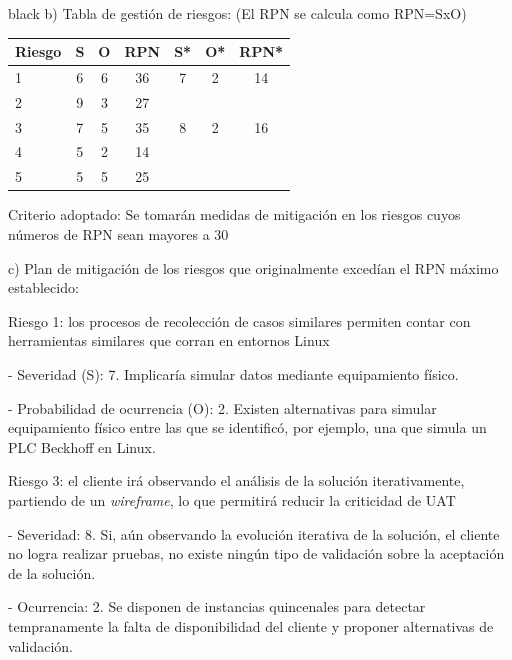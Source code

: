 \documentclass[11pt]{charter}
\begin{document}
\begin{consigna}{black}
b) Tabla de gestión de riesgos:      (El RPN se calcula como RPN=SxO)

\begin{table}[htpb]
\centering
\begin{tabularx}{\linewidth}{@{}|X|c|c|c|c|c|c|@{}}
\hline
\rowcolor[HTML]{C0C0C0} 
Riesgo & S & O & RPN & S* & O* & RPN* \\ \hline
\rowcolor[HTML]{D3D3D3} 
    1   &  6 &  6 & 36    &  7  &  2  & 14     \\ \hline
    2  &  9 &  3 &   27  &    &    &      \\ \hline
\rowcolor[HTML]{D3D3D3} 
    3  &  7 &  5 &   35  &  8  &  2  & 16     \\ \hline
    4  &  5 &  2 &   14  &    &    &      \\ \hline
    5  &  5 &  5 &   25  &    &    &      \\ \hline
\end{tabularx}%
\end{table}

Criterio adoptado: 
Se tomarán medidas de mitigación en los riesgos cuyos números de RPN sean mayores a 30

c) Plan de mitigación de los riesgos que originalmente excedían el RPN máximo establecido:
 
Riesgo 1: los procesos de recolección de casos similares permiten contar con herramientas similares que corran en entornos Linux  

  - Severidad (S): 7. Implicaría simular datos mediante equipamiento físico.
  
  - Probabilidad de ocurrencia (O): 2. Existen alternativas para simular equipamiento físico entre las que se identificó, por ejemplo, una que simula un PLC Beckhoff en Linux.

Riesgo 3: el cliente irá observando el análisis de la solución iterativamente, partiendo de un \textit{wireframe}, lo que permitirá reducir la criticidad de UAT

- Severidad: 8. Si, aún observando la evolución iterativa de la solución, el cliente no logra realizar pruebas, no existe ningún tipo de validación sobre la aceptación de la solución.

- Ocurrencia: 2. Se disponen de instancias quincenales para detectar tempranamente la falta de disponibilidad del cliente y proponer alternativas de validación.
 
\end{consigna}
\end{document}
